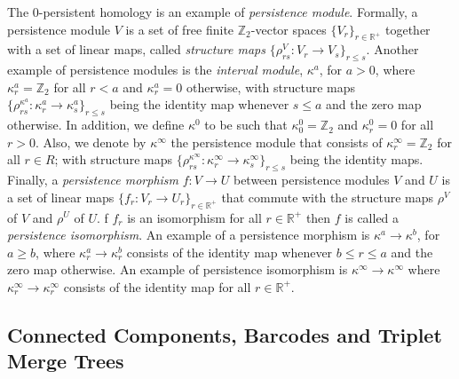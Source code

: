\documentclass{article}
\newcommand{\R}{\mathbb{R}^+}
\newcommand{\Z}{\mathbb{Z}}
\newcommand{\scst}{\scriptscriptstyle}
\newcommand{\ka}{\kappa^a}
\newcommand{\kinfty}{\kappa^\infty}
\begin{document}
The 0-persistent homology is an example of \emph{persistence module}. Formally, a persistence module $V$ is a set of free finite $\Z_2$-vector spaces $\{V_r\}_{r\in \R}$ together with a set of linear maps, called \emph{structure maps} $\{\rho_{rs}^{\scst V}\colon V_r\rightarrow V_s\}_{r\leq s}$.
Another example of persistence modules is
the \emph{interval module}, $\ka$, for 
$a>0$,
where $\ka_r= \Z_2$ for all $r <a$ and $\ka_r= 0$ otherwise, with structure maps 
$\{\rho^{\ka}_{rs}\colon \ka_r\to \ka_s\}_{r\leq s}$ being the identity map whenever $s\leq a$ and  the zero map otherwise.
In addition, we define $\kappa^0$ to be such that $\kappa^0_0= \Z_2$ and $\kappa^0_r= 0$ for all $r>0$.
Also, we denote by  $\kinfty$  
the persistence module that consists of 
$\kinfty_r= \Z_2$ for all $r\in R$; with structure maps $\{\rho^{\kinfty}_{rs}\colon\kinfty_r\to \kinfty_s\}_{r\leq s}$ being the identity maps.
%
Finally, a \emph{persistence morphism} $f\colon V\rightarrow U$ between persistence modules $V$ and $U$ is a set of linear maps $\big\{f_r\colon V_r\rightarrow U_r\big\}_{r \in \R}$ that commute with the structure maps 
$\rho^{\scst V}$ of $V$ and 
$\rho^{\scst U}$ of $U$. 
f $f_r$ is an isomorphism for all $r \in \R$ then $f$ is called a \emph{persistence isomorphism}.
An example of a persistence morphism is
$\kappa^{a} \rightarrow \kappa^{b}$, for $a\geq b$, where $\kappa^{a}_r \rightarrow \kappa^{b}_r$
consists of the identity map whenever $b\leq r\leq a$ and the zero map otherwise. An example of persistence isomorphism is
$\kinfty\rightarrow \kinfty$
where $\kinfty_r \rightarrow \kinfty_r$
consists of the identity map for all $r\in\R$.

\subsection{Connected Components, Barcodes and Triplet Merge
Trees}
\end{document}
